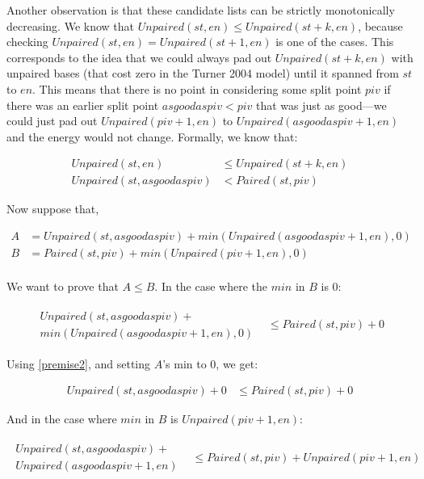 \documentclass{cshonours}
\begin{document}
Another observation is that these candidate lists can be strictly monotonically decreasing. We know that $Unpaired(st, en) \leq Unpaired(st + k, en)$, because checking $Unpaired(st, en) = Unpaired(st + 1, en)$ is one of the cases. This corresponds to the idea that we could always pad out $Unpaired(st + k, en)$ with unpaired bases (that cost zero in the Turner 2004 model) until it spanned from $st$ to $en$. This means that there is no point in considering some split point $piv$ if there was an earlier split point $asgoodaspiv < piv$ that was just as good---we could just pad out $Unpaired(piv + 1, en)$ to $Unpaired(asgoodaspiv + 1, en)$ and the energy would not change. Formally, we know that:

\begin{align}
Unpaired(st, en) &\leq Unpaired(st + k, en) \label{premise1} \\
Unpaired(st, asgoodaspiv) &< Paired(st, piv) \label{premise2}
\end{align}

Now suppose that,

\begin{align*}
A &= Unpaired(st, asgoodaspiv) + min(Unpaired(asgoodaspiv + 1, en), 0) && \\
B &= Paired(st, piv) + min(Unpaired(piv + 1, en), 0)  && \\
\end{align*}

We want to prove that $A \leq B$. In the case where the $min$ in $B$ is 0:

\begin{align*}
\begin{array}{l}
Unpaired(st, asgoodaspiv) + \\
min(Unpaired(asgoodaspiv + 1, en), 0)
\end{array} &\leq Paired(st, piv) + 0
\end{align*}

Using \autoref{premise2}, and setting $A$'s min to 0, we get:

\begin{align*}
Unpaired(st, asgoodaspiv) + 0 &\leq Paired(st, piv) + 0
\end{align*}

And in the case where $min$ in $B$ is $Unpaired(piv + 1, en)$:

\begin{align*}
\begin{array}{l}
Unpaired(st, asgoodaspiv) + \\
Unpaired(asgoodaspiv + 1, en)
\end{array} &\leq Paired(st, piv) + Unpaired(piv + 1, en)
\end{align*}
\end{document}
